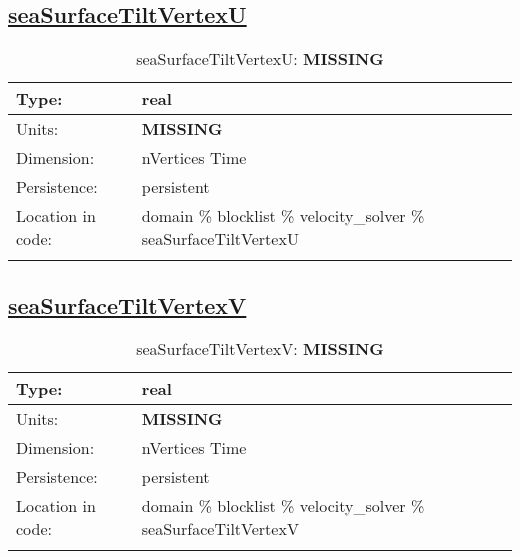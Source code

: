 \subsection[seaSurfaceTiltVertexU]{\hyperref[sec:var_tab_velocity_solver]{seaSurfaceTiltVertexU}}
\label{subsec:var_sec_velocity_solver_seaSurfaceTiltVertexU}
\begin{center}
\begin{longtable}{| p{2.0in} | p{4.0in} |}
        \hline 
        Type: & real \\
        \hline 
        Units: & {\bf \color{red} MISSING} \\
        \hline 
        Dimension: & nVertices Time \\
        \hline 
        Persistence: & persistent \\
        \hline 
         Location in code: & domain \% blocklist \% velocity\_solver \% seaSurfaceTiltVertexU \\
         \hline 
    \caption{seaSurfaceTiltVertexU: {\bf \color{red} MISSING}}
\end{longtable}
\end{center}
\subsection[seaSurfaceTiltVertexV]{\hyperref[sec:var_tab_velocity_solver]{seaSurfaceTiltVertexV}}
\label{subsec:var_sec_velocity_solver_seaSurfaceTiltVertexV}
\begin{center}
\begin{longtable}{| p{2.0in} | p{4.0in} |}
        \hline 
        Type: & real \\
        \hline 
        Units: & {\bf \color{red} MISSING} \\
        \hline 
        Dimension: & nVertices Time \\
        \hline 
        Persistence: & persistent \\
        \hline 
         Location in code: & domain \% blocklist \% velocity\_solver \% seaSurfaceTiltVertexV \\
         \hline 
    \caption{seaSurfaceTiltVertexV: {\bf \color{red} MISSING}}
\end{longtable}
\end{center}
